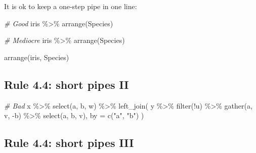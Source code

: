 \documentclass[
  letterpaper,
  DIV=11,
  numbers=noendperiod]{scrreprt}
\newenvironment{Shaded}{\begin{snugshade}}{\end{snugshade}}
\newcommand{\AttributeTok}[1]{\textcolor[rgb]{0.49,0.56,0.16}{#1}}
\newcommand{\CommentTok}[1]{\textcolor[rgb]{0.38,0.63,0.69}{\textit{#1}}}
\newcommand{\FunctionTok}[1]{\textcolor[rgb]{0.02,0.16,0.49}{#1}}
\newcommand{\NormalTok}[1]{\textcolor[rgb]{0.00,0.44,0.13}{#1}}
\newcommand{\SpecialCharTok}[1]{\textcolor[rgb]{0.25,0.44,0.63}{#1}}
\newcommand{\StringTok}[1]{\textcolor[rgb]{0.25,0.44,0.63}{#1}}
\begin{document}
It is ok to keep a one-step pipe in one line:

\begin{Shaded}
\begin{Highlighting}[]
\CommentTok{\# Good}
\NormalTok{iris }\SpecialCharTok{\%\textgreater{}\%} \FunctionTok{arrange}\NormalTok{(Species)}

\CommentTok{\# Mediocre}
\NormalTok{iris }\SpecialCharTok{\%\textgreater{}\%}
  \FunctionTok{arrange}\NormalTok{(Species)}

\FunctionTok{arrange}\NormalTok{(iris, Species)}
\end{Highlighting}
\end{Shaded}

\hypertarget{rule-4.4-short-pipes-ii}{%
\subsection{Rule 4.4: short pipes II}\label{rule-4.4-short-pipes-ii}}

\begin{Shaded}
\begin{Highlighting}[]
\CommentTok{\# Bad}
\NormalTok{x }\SpecialCharTok{\%\textgreater{}\%}
  \FunctionTok{select}\NormalTok{(a, b, w) }\SpecialCharTok{\%\textgreater{}\%}
  \FunctionTok{left\_join}\NormalTok{(}
\NormalTok{    y }\SpecialCharTok{\%\textgreater{}\%} \FunctionTok{filter}\NormalTok{(}\SpecialCharTok{!}\NormalTok{u) }\SpecialCharTok{\%\textgreater{}\%} \FunctionTok{gather}\NormalTok{(a, v, }\SpecialCharTok{{-}}\NormalTok{b) }\SpecialCharTok{\%\textgreater{}\%} \FunctionTok{select}\NormalTok{(a, b, v),}
    \AttributeTok{by =} \FunctionTok{c}\NormalTok{(}\StringTok{"a"}\NormalTok{, }\StringTok{"b"}\NormalTok{)}
\NormalTok{  )}
\end{Highlighting}
\end{Shaded}

\hypertarget{rule-4.4-short-pipes-iii}{%
\subsection{Rule 4.4: short pipes III}\label{rule-4.4-short-pipes-iii}}
\end{document}
